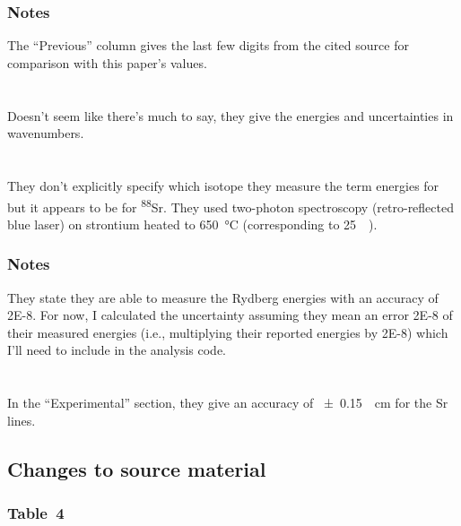 \documentclass{article}
\newcommand{\tsup}{\textsuperscript}													%
\newcommand{\Sr}[1]{\tsup{#1}\textnormal{Sr}}											%
\begin{document}
\subsubsection{Notes}

The ``Previous'' column gives the last few digits from the cited source for comparison with this paper's values. 

\section{}

Doesn't seem like there's much to say, they give the energies and uncertainties in wavenumbers. 

\section{}

They don't explicitly specify which isotope they measure the term energies for but it appears to be for \Sr{88}. They used two-photon spectroscopy (retro-reflected blue laser) on strontium heated to \SI{650}{\celsius} (corresponding to \SI{25}{\milli\Torr}). 

\subsubsection{Notes}

They state they are able to measure the Rydberg energies with an accuracy of \num{2E-8}. For now, I calculated the uncertainty assuming they mean an error \num{2E-8} of their measured energies (i.e., multiplying their reported energies by \num{2E-8}) which I'll need to include in the analysis code. 

\section{}

In the ``Experimental'' section, they give an accuracy of \SI{\pm0.15}{\per\cm} for the Sr lines. 

\subsection{Changes to source material}

\subsubsection{Table~4}
\end{document}
